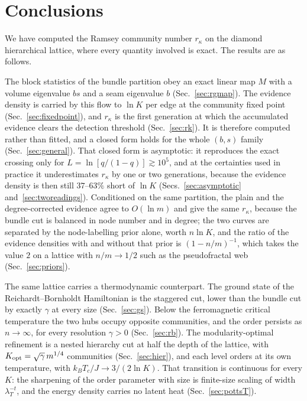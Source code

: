 \documentclass[preprint,12pt]{elsarticle}
\newcommand{\rk}{r_{\kappa}}
\begin{document}
\section{Conclusions}
\label{sec:conclusions}

We have computed the Ramsey community number $\rk$ on the diamond hierarchical
lattice, where every quantity involved is exact. The results are as follows.

The block statistics of the bundle partition obey an exact linear map $M$ with a
volume eigenvalue $bs$ and a seam eigenvalue $b$ (Sec.~\ref{sec:rgmap}). The
evidence density is carried by this flow to $\ln K$ per edge at the community
fixed point (Sec.~\ref{sec:fixedpoint}), and $\rk$ is the first generation at
which the accumulated evidence clears the detection threshold
(Sec.~\ref{sec:rk}). It is therefore computed rather than fitted, and a closed
form holds for the whole $(b,s)$ family (Sec.~\ref{sec:general}). That closed
form is asymptotic: it reproduces the exact crossing only for
$L=\ln[q/(1-q)]\gtrsim10^5$, and at the certainties used in practice it
underestimates $\rk$ by one or two generations, because the evidence density is
then still $37$--$63\%$ short of $\ln K$ (Secs.~\ref{sec:asymptotic}
and~\ref{sec:tworeadings}). Conditioned on the same partition, the plain and
the degree-corrected evidence agree to $O(\ln m)$ and give the same $\rk$,
because the bundle cut is balanced in node number and in degree; the two curves
are separated by the node-labelling prior alone, worth $n\ln K$, and the ratio
of the evidence densities with and without that prior is $(1-n/m)^{-1}$, which
takes the value $2$ on a lattice with $n/m\to1/2$ such as the pseudofractal
web~\cite{vazquez2026communitystructurepseudofractalweb}
(Sec.~\ref{sec:priors}).

The same lattice carries a thermodynamic counterpart. The ground state of the
Reichardt--Bornholdt Hamiltonian is the staggered cut, lower than the bundle cut
by exactly $\gamma$ at every size (Sec.~\ref{sec:gs}). Below the ferromagnetic
critical temperature the two hubs occupy opposite communities, and the order
persists as $n\to\infty$, for every resolution $\gamma>0$ (Sec.~\ref{sec:rb}).
The modularity-optimal refinement is a nested hierarchy cut at half the depth of
the lattice, with $K_{\rm opt}=\sqrt{\gamma}\,m^{1/4}$ communities
(Sec.~\ref{sec:hier}), and each level orders at its own temperature, with
$k_BT_c/J\to3/(2\ln K)$. That transition is continuous for every $K$: the
sharpening of the order parameter with size is finite-size scaling of width
$\lambda_T^{-t}$, and the energy density carries no latent heat
(Sec.~\ref{sec:pottsT}).
\end{document}
